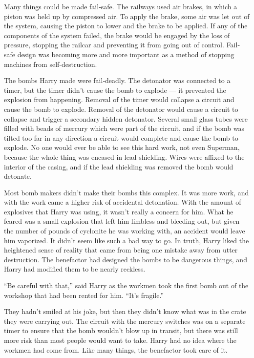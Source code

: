 Many things could be made fail‐safe. The railways used air brakes, in
which a piston was held up by compressed air. To apply the brake, some
air was let out of the system, causing the piston to lower and the brake
to be applied. If any of the components of the system failed, the brake
would be engaged by the loss of pressure, stopping the railcar and
preventing it from going out of control. Fail‐safe design was becoming
more and more important as a method of stopping machines from
self‐destruction.

The bombs Harry made were fail‐deadly. The detonator was connected to a
timer, but the timer didn't cause the bomb to explode --- it prevented
the explosion from happening. Removal of the timer would collapse a
circuit and cause the bomb to explode. Removal of the detonator would
cause a circuit to collapse and trigger a secondary hidden detonator.
Several small glass tubes were filled with beads of mercury which were
part of the circuit, and if the bomb was tilted too far in any direction
a circuit would complete and cause the bomb to explode. No one would
ever be able to see this hard work, not even Superman, because the whole
thing was encased in lead shielding. Wires were affixed to the interior
of the casing, and if the lead shielding was removed the bomb would
detonate.

Most bomb makers didn't make their bombs this complex. It was more work,
and with the work came a higher risk of accidental detonation. With the
amount of explosives that Harry was using, it wasn't really a concern
for him. What he feared was a small explosion that left him limbless and
bleeding out, but given the number of pounds of cyclonite he was working
with, an accident would leave him vaporized. It didn't seem like such a
bad way to go. In truth, Harry liked the heightened sense of reality
that came from being one mistake away from utter destruction. The
benefactor had designed the bombs to be dangerous things, and Harry had
modified them to be nearly reckless.

``Be careful with that,'' said Harry as the workmen took the first bomb
out of the workshop that had been rented for him. ``It's fragile.''

They hadn't smiled at his joke, but then they didn't know what was in
the crate they were carrying out. The circuit with the mercury switches
was on a separate timer to ensure that the bomb wouldn't blow up in
transit, but there was still more risk than most people would want to
take. Harry had no idea where the workmen had come from. Like many
things, the benefactor took care of it.

